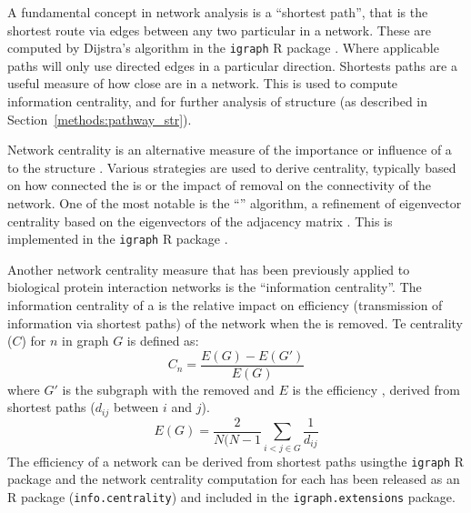A fundamental concept in network analysis is a ``\gls{shortest path}'', that is the shortest route via \glspl{edge} between any two particular  in a network. These are computed by Dijstra's algorithm \citep{Dijkstra1959} in the \texttt{igraph} R package \citep{igraph}. Where applicable paths will only use directed \glspl{edge} in a particular direction. Shortests paths are a useful measure of how close  are in a network. This is used to compute \gls{information centrality}, and for further analysis of  structure (as described in Section~\ref{methods:pathway_str}).

Network \gls{centrality} is an alternative measure of the importance or influence of a  to the  structure \citep{Borgatti2005}. Various strategies are used to derive centrality,  typically based on how connected the  is or the impact of  removal on the connectivity of the network. One of the most notable is the ``'' algorithm, a refinement of eigenvector \gls{centrality} based on the eigenvectors of the adjacency matrix \citep{Brin1998}. This is implemented in the \texttt{igraph} R package \citep{igraph}.

Another network \gls{centrality} measure that has been previously applied to biological protein interaction networks \citep{Kranthi2013} is the ``\gls{information centrality}''. The \gls{information centrality} of a  is the relative impact on efficiency (transmission of information via \glspl{shortest path}) of the network when the  is removed. Te \gls{centrality} ($C$) \citep{Kranthi2013} for  $n$ in graph $G$ is defined as: $$C_n = \frac{E(G)-E(G')}{E(G)}$$ where $G'$ is the subgraph with the  removed and $E$ is the efficiency \citep{Latora2001}, derived from \glspl{shortest path} ($d_{ij}$ between  $i$ and $j$). $$E(G) = \frac{2}{N(N-1} \sum_{i<j \in G}^{} \frac{1}{d_{ij}}$$ The efficiency of a network can be derived from \glspl{shortest path} usingthe \texttt{igraph} R package and the network \gls{centrality} computation for each  has been released as an R package (\texttt{info.centrality}) and included in the \texttt{igraph.extensions} package.

